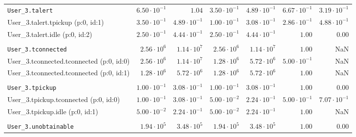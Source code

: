 \begin{table}[htbp]
{\begin{tabular}{lrrrrrr}
\\[-8pt]\texttt{User\_3.talert}                       & $6.50 \cdot 10^{-1}$ &               $1.04$ & $3.50 \cdot 10^{-1}$ & $4.89 \cdot 10^{-1}$ & $6.67 \cdot 10^{-1}$ & $3.19 \cdot 10^{-1}$ \\
\hspace{3mm}User\_3.talert.tpickup (p:0, id:1)        & $3.50 \cdot 10^{-1}$ & $4.89 \cdot 10^{-1}$ & $1.00 \cdot 10^{-1}$ & $3.08 \cdot 10^{-1}$ & $2.86 \cdot 10^{-1}$ & $4.88 \cdot 10^{-1}$ \\
\hspace{3mm}User\_3.talert.idle (p:0, id:2)           & $2.50 \cdot 10^{-1}$ & $4.44 \cdot 10^{-1}$ & $2.50 \cdot 10^{-1}$ & $4.44 \cdot 10^{-1}$ &               $1.00$ &               $0.00$ \\
\\[-8pt]\texttt{User\_3.tconnected}                   &  $2.56 \cdot 10^{6}$ &  $1.14 \cdot 10^{7}$ &  $2.56 \cdot 10^{6}$ &  $1.14 \cdot 10^{7}$ &               $1.00$ &                  NaN \\
\hspace{3mm}User\_3.tconnected.tconnected (p:0, id:0) &  $2.56 \cdot 10^{6}$ &  $1.14 \cdot 10^{7}$ &  $1.28 \cdot 10^{6}$ &  $5.72 \cdot 10^{6}$ & $5.00 \cdot 10^{-1}$ &                  NaN \\
\hspace{3mm}User\_3.tconnected.tconnected (p:0, id:1) &  $1.28 \cdot 10^{6}$ &  $5.72 \cdot 10^{6}$ &  $1.28 \cdot 10^{6}$ &  $5.72 \cdot 10^{6}$ &               $1.00$ &                  NaN \\
\\[-8pt]\texttt{User\_3.tpickup}                      & $1.00 \cdot 10^{-1}$ & $3.08 \cdot 10^{-1}$ & $1.00 \cdot 10^{-1}$ & $3.08 \cdot 10^{-1}$ &               $1.00$ &               $0.00$ \\
\hspace{3mm}User\_3.tpickup.tconnected (p:0, id:0)    & $1.00 \cdot 10^{-1}$ & $3.08 \cdot 10^{-1}$ & $5.00 \cdot 10^{-2}$ & $2.24 \cdot 10^{-1}$ & $5.00 \cdot 10^{-1}$ & $7.07 \cdot 10^{-1}$ \\
\hspace{3mm}User\_3.tpickup.idle (p:0, id:1)          & $5.00 \cdot 10^{-2}$ & $2.24 \cdot 10^{-1}$ & $5.00 \cdot 10^{-2}$ & $2.24 \cdot 10^{-1}$ &               $1.00$ &                  NaN \\
\\[-8pt]\texttt{User\_3.unobtainable}                 &  $1.94 \cdot 10^{5}$ &  $3.48 \cdot 10^{5}$ &  $1.94 \cdot 10^{5}$ &  $3.48 \cdot 10^{5}$ &               $1.00$ &               $0.00$ \\

\end{tabular}}
\end{table}
